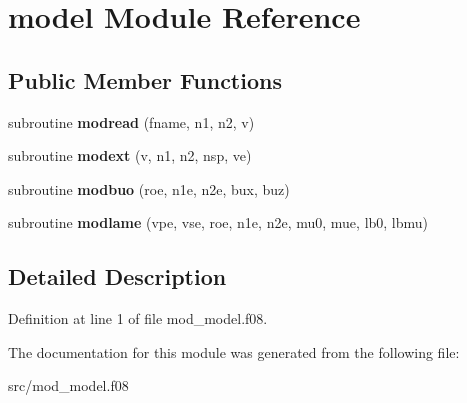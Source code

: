 \hypertarget{classmodel}{\section{model Module Reference}
\label{classmodel}
}
\subsection*{Public Member Functions}
\begin{DoxyCompactItemize}
\item 
\hypertarget{classmodel_a0f6356e2eef6603bbf2e7b7d49fda442}{subroutine {\bfseries modread} (fname, n1, n2, v)}\label{classmodel_a0f6356e2eef6603bbf2e7b7d49fda442}

\item 
\hypertarget{classmodel_a1cdf57d448aa81bb8572b80e0cbc710b}{subroutine {\bfseries modext} (v, n1, n2, nsp, ve)}\label{classmodel_a1cdf57d448aa81bb8572b80e0cbc710b}

\item 
\hypertarget{classmodel_a29f46da7295e75233a7ff11f1059758b}{subroutine {\bfseries modbuo} (roe, n1e, n2e, bux, buz)}\label{classmodel_a29f46da7295e75233a7ff11f1059758b}

\item 
\hypertarget{classmodel_a6446256a8c872aa268c423c6559f2c3f}{subroutine {\bfseries modlame} (vpe, vse, roe, n1e, n2e, mu0, mue, lb0, lbmu)}\label{classmodel_a6446256a8c872aa268c423c6559f2c3f}

\end{DoxyCompactItemize}


\subsection{Detailed Description}


Definition at line 1 of file mod\-\_\-model.\-f08.



The documentation for this module was generated from the following file\-:\begin{DoxyCompactItemize}
\item 
src/mod\-\_\-model.\-f08\end{DoxyCompactItemize}
